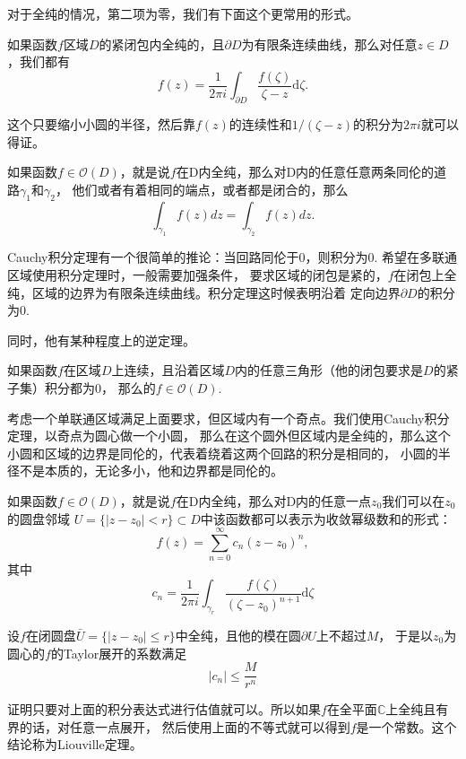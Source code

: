 对于全纯的情况，第二项为零，我们有下面这个更常用的形式。

\begin{thm}[Cauchy积分公式]
    如果函数$f$区域$D$的紧闭包内全纯的，且$\partial D$为有限条连续曲线，那么对任意$z\in D$，我们都有
	\[
		f(z)=\frac{1}{2\pi i}\int_{\partial D}\frac{f(\zeta)}{\zeta -z}\mathrm{d}\zeta.
	\]
\end{thm}

这个只要缩小小圆的半径，然后靠$f(z)$的连续性和$1/(\zeta -z)$的积分为$2\pi i$就可以得证。

\begin{thm}[Cauchy积分定理]
	如果函数$f \in \mathcal{O}(D)$，就是说$f$在D内全纯，那么对D内的任意任意两条同伦的道路$\gamma_1$和$\gamma_2$，
    他们或者有着相同的端点，或者都是闭合的，那么
	\[
		\int_{\gamma_1}f(z)dz=\int_{\gamma_2}f(z)dz.
	\]
\end{thm}
Cauchy积分定理有一个很简单的推论：当回路同伦于0，则积分为0. 希望在多联通区域使用积分定理时，一般需要加强条件，
要求区域的闭包是紧的，$f$在闭包上全纯，区域的边界为有限条连续曲线。积分定理这时候表明沿着
定向边界$\partial D$的积分为0.

同时，他有某种程度上的逆定理。
\begin{thm}[Morera]
	如果函数$f $在区域$D$上连续，且沿着区域$D$内的任意三角形（他的闭包要求是$D$的紧子集）积分都为$0$，
    那么的$f \in \mathcal{O}(D)$.
\end{thm}
考虑一个单联通区域满足上面要求，但区域内有一个奇点。我们使用Cauchy积分定理，以奇点为圆心做一个小圆，
那么在这个圆外但区域内是全纯的，那么这个小圆和区域的边界是同伦的，代表着绕着这两个回路的积分是相同的，
小圆的半径不是本质的，无论多小，他和边界都是同伦的。

\begin{thm}[Taylor级数]
    如果函数$f \in \mathcal{O}(D)$，就是说$f$在D内全纯，那么对D内的任意一点$z_0$我们可以在$z_0$的圆盘邻域
    $U=\{|z-z_0|<r\}\subset D$中该函数都可以表示为收敛幂级数和的形式：
	\[
		f(z)=\sum_{n=0}^\infty c_n(z-z_0)^n,
	\]
其中
	\[
		c_n=\frac{1}{2\pi i}\int_{\gamma_r}\frac{f(\zeta)}{(\zeta -z_0)^{n+1}}\mathrm{d}\zeta
	\]
\end{thm}

\begin{pro}[Cauchy不等式]
    设$f$在闭圆盘$\bar{U}=\{|z-z_0|\leq r\}$中全纯，且他的模在圆$\partial U$上不超过$M$，
    于是以$z_0$为圆心的$f$的Taylor展开的系数满足
	\[|c_n|\leq \frac{M}{r^n}\]
\end{pro}
证明只要对上面的积分表达式进行估值就可以。所以如果$f$在全平面$\mathbb{C}$上全纯且有界的话，对任意一点展开，
然后使用上面的不等式就可以得到$f$是一个常数。这个结论称为Liouville定理。

